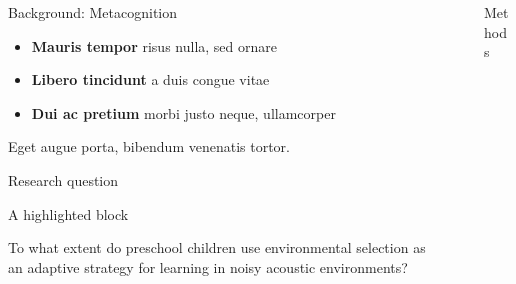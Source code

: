 \documentclass[final]{beamer}
\newlength{\sepwidth}
\newlength{\colwidth}
\newcommand{\separatorcolumn}{\begin{column}{\sepwidth}\end{column}}
\begin{document}
\begin{frame}[t]
\begin{columns}[t]
\begin{column}{\colwidth}
\begin{block}{Background: Metacognition}
    \begin{itemize}
      \item \textbf{Mauris tempor} risus nulla, sed ornare
      \item \textbf{Libero tincidunt} a duis congue vitae
      \item \textbf{Dui ac pretium} morbi justo neque, ullamcorper
    \end{itemize}

    Eget augue porta, bibendum venenatis tortor.

  \end{block}
  
    \begin{block}{Research question}
    
    \end{block}

  \begin{alertblock}{A highlighted block}

    To what extent do preschool children use environmental selection as an adaptive strategy for learning in noisy acoustic environments?

  \end{alertblock}

\end{column}

\separatorcolumn

\begin{column}{\colwidth}

  \begin{block}{Methods}


\end{block}
\end{column}
\end{columns}
\end{frame}
\end{document}

